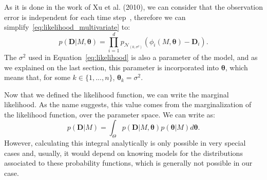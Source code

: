 As it is done in the work of Xu et al. (2010), we can consider that the 
observation error is independent for each time step~\cite{Xura20}, 
therefore we can simplify~\ref{eq:likelihood_multivariate} to:
\begin{equation}
    p ({\bm D} | M, {\bm \theta}) = \prod_{i = 1}^d p_{\mathcal{N}_{\left(0, 
        \sigma^2\right)}} (\phi_i (M, {\bm \theta}) - {\bm D}_i).
\label{eq:likelihood}
\end{equation}
The $\sigma^2$ used in Equation~\ref{eq:likelihood} is also a parameter
of the model, and as we explained on the last section, this parameter is
incorporated into ${\bm \theta}$, which means that, for some $k \in \{1,
..., n\}$, ${\bm \theta}_k = \sigma^2$.

Now that we defined the likelihood function, we can write the marginal 
likelihood. As the name suggests, this value comes from the
marginalization of the likelihood function, over the parameter space. We
can write as:
\begin{equation}
    p ({\bm D} | M) = \int_{\Theta} p ({\bm D} | M, {\bm \theta}) 
        p ({\bm \theta} | M)d{\bm\theta}.
\label{eq:marginal_likelihood}
\end{equation}
However, calculating this integral analytically is only possible in 
very special cases and, usually, it would depend on knowing models for 
the distributions associated to these probability functions, which is 
generally not possible in our case.

